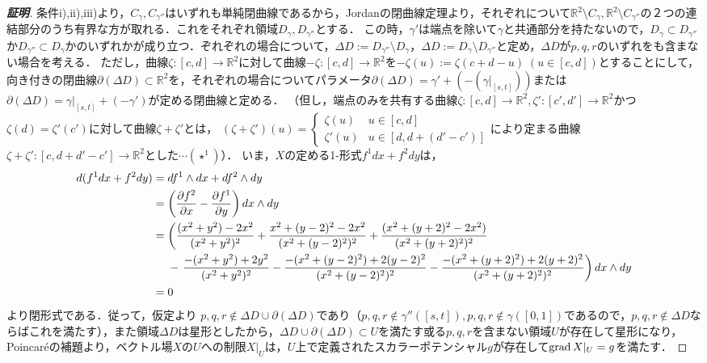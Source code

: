 \documentclass[dvipdfmx,a4paper,uplatex]{jsarticle}
\begin{document}
\begin{proof}[\bf{証明}]
条件i),ii),iii)より，$C_\gamma,C_{\gamma''}$はいずれも単純閉曲線であるから，Jordanの閉曲線定理より，それぞれについて$\mathbb{R}^2\setminus C_\gamma,\mathbb{R}^2\setminus C_{\gamma''}$の２つの連結部分のうち有界な方が取れる．これをそれぞれ領域$D_\gamma,D_{\gamma''}$とする．
この時，$\gamma'$は端点を除いて$\gamma$と共通部分を持たないので，$D_\gamma\subset D_{\gamma''}$か$D_{\gamma''}\subset D_\gamma$かのいずれかが成り立つ．ぞれぞれの場合について，$\Delta D:=D_{\gamma''}\setminus D_\gamma$，$\Delta D:=D_\gamma\setminus D_{\gamma''}$と定め，$\Delta D$が$p,q,r$のいずれをも含まない場合を考える．
ただし，曲線$\zeta:[c,d]\to\mathbb{R}^2$に対して曲線$-\zeta:[c,d]\to\mathbb{R}^2$を$-\zeta(u):=\zeta(c+d-u)\;(u\in[c,d])$とすることにして，向き付きの閉曲線$\partial(\Delta D)\subset\mathbb{R}^2$を，それぞれの場合についてパラメータ$\partial(\Delta D)=\gamma'+(-(\gamma|_{[s,t]}))$または$\partial(\Delta D)=\gamma|_{[s,t]}+(-\gamma')$が定める閉曲線と定める．
（但し，端点のみを共有する曲線$\zeta:[c,d]\to\mathbb{R}^2,\zeta':[c',d']\to\mathbb{R}^2$かつ$\zeta(d)=\zeta'(c')$に対して曲線$\zeta+\zeta'$とは，
$(\zeta+\zeta')(u)=\begin{cases}
    \zeta(u) & u\in[c,d] \\
    \zeta'(u) & u\in[d,d+(d'-c')]
\end{cases}$により定まる曲線$\zeta+\zeta':[c,d+d'-c']\to\mathbb{R}^2$とした$\cdots(\star^1)$）．
いま，$X$の定める1-形式$f^1dx+f^2dy$は，
\begin{align*}
    d(f^1dx+f^2dy) &= df^1\wedge dx+df^2\wedge dy\\
    &= \left( \frac{\partial f^2}{\partial x}-\frac{\partial f^1}{\partial y} \right) dx\wedge dy \\
    &= \left( \frac{(x^2+y^2)-2x^2}{(x^2+y^2)^2} + \frac{x^2+(y-2)^2-2x^2}{(x^2+(y-2)^2)^2} + \frac{(x^2+(y+2)^2-2x^2)}{(x^2+(y+2)^2)^2}\right.\\*
    &\hphantom{{}={}}- \left. \frac{-(x^2+y^2)+2y^2}{(x^2+y^2)^2} - \frac{-(x^2+(y-2)^2)+2(y-2)^2}{(x^2+(y-2)^2)^2} - \frac{-(x^2+(y+2)^2)+2(y+2)^2}{(x^2+(y+2)^2)^2} \right) dx\wedge dy \\
    &= 0
\end{align*}
より閉形式である．従って，仮定より
$p,q,r\notin \Delta D\cup\partial(\Delta D)$であり（$p,q,r\notin\gamma''([s,t]),p,q,r\notin\gamma([0,1])$であるので，$p,q,r\notin \Delta D$ならばこれを満たす），また領域$\Delta D$は星形としたから，$\Delta D\cup\partial(\Delta D)\subset U$を満たす或る$p,q,r$を含まない領域$U$が存在して星形になり，Poincaréの補題より，ベクトル場$X$の$U$への制限$X|_U$は，$U$上で定義されたスカラーポテンシャル$g$が存在して$\operatorname{\mathrm{grad}} X|_U=g$を満たす．

\end{proof}
\end{document}
